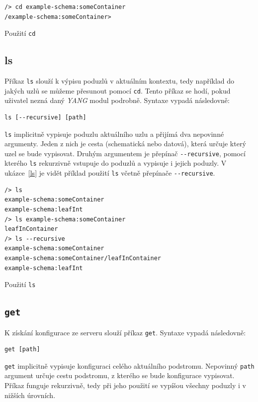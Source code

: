 \documentclass[thesis=B,czech,hidelinks]{FITthesis}[2019/03/06]
\begin{document}
\begin{listing}
\begin{verbatim}
/> cd example-schema:someContainer
/example-schema:someContainer>
\end{verbatim}
\caption{Použití \texttt{cd}}\label{cd}
\end{listing}

\subsection{ls}
Příkaz \texttt{ls} slouží k výpisu poduzlů v aktuálním kontextu, tedy například do jakých uzlů se můžeme přesunout pomocí \texttt{cd}. Tento příkaz se hodí, pokud uživatel nezná daný \textit{YANG} modul podrobně. Syntaxe vypadá následovně:
\begin{verbatim}
ls [--recursive] [path]
\end{verbatim}
\texttt{ls} implicitně vypisuje poduzlu aktuálního uzlu a přijímá dva nepovinné argumenty. Jeden z nich je cesta (schematická nebo datová), která určuje který uzel se bude vypisovat. Druhým argumentem je přepínač \verb¨--recursive¨, pomocí kterého \texttt{ls} rekurzivně vstupuje do poduzlů a vypisuje i jejich poduzly. V ukázce~\ref{ls} je vidět příklad použití \texttt{ls} včetně přepínače \verb¨--recursive¨.

\begin{listing}
\begin{verbatim}
/> ls
example-schema:someContainer
example-schema:leafInt
/> ls example-schema:someContainer
leafInContainer
/> ls --recursive
example-schema:someContainer
example-schema:someContainer/leafInContainer
example-schema:leafInt
\end{verbatim}
\caption{Použití \texttt{ls}}\label{ls}
\end{listing}
\subsection{\texttt{get}}

K získání konfigurace ze serveru slouží příkaz \texttt{get}. Syntaxe vypadá následovně:
\begin{verbatim}
get [path]
\end{verbatim}
\texttt{get} implicitně vypisuje konfiguraci celého aktuálního podstromu. Nepovinný \texttt{path} argument určuje cestu podstromu, z kterého se bude konfigurace vypisovat. Příkaz funguje rekurzivně, tedy při jeho použití se vypíšou všechny poduzly i v nižších úrovních.
\end{document}
